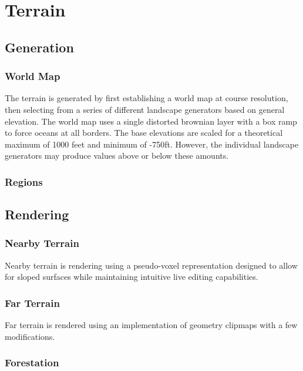 \chapter{Terrain}

\section{Generation}

\subsection{World Map}

The terrain is generated by first establishing a world map at course resolution, then selecting from a series of different landscape generators based on general elevation.
The world map uses a single distorted brownian layer with a box ramp to force oceans at all borders.
The base elevations are scaled for a theoretical maximum of 1000 feet and minimum of -750ft.
However, the individual landscape generators may produce values above or below these amounts.

\subsection{Regions}

\section{Rendering}

\subsection{Nearby Terrain}

Nearby terrain is rendering using a pseudo-voxel representation designed to allow for sloped surfaces while maintaining intuitive live editing capabilities.

\subsection{Far Terrain}

Far terrain is rendered using an implementation of geometry clipmaps with a few modifications.

\subsection{Forestation}
